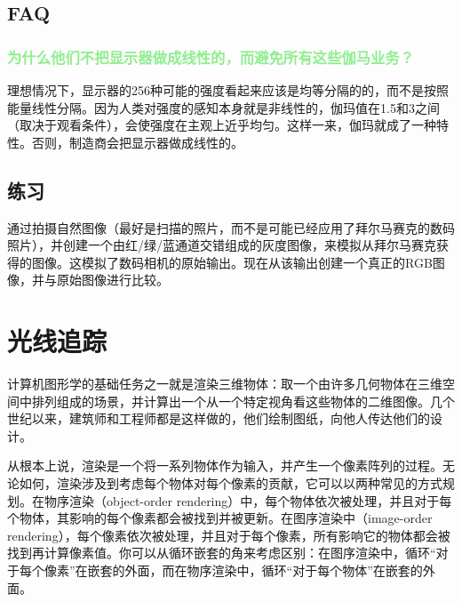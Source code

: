 \documentclass[lang=cn,12pt,marginpar=margintrue]{elegantbook}
\begin{document}
\section{FAQ}

\subsection{\textcolor{lightgreen}{为什么他们不把显示器做成线性的，而避免所有这些伽马业务？}}

理想情况下，显示器的256种可能的强度看起来应该是均等分隔的的，而不是按照能量线性分隔。因为人类对强度的感知本身就是非线性的，伽玛值在1.5和3之间（取决于观看条件），会使强度在主观上近乎均匀。这样一来，伽玛就成了一种特性。否则，制造商会把显示器做成线性的。

\section{练习}

通过拍摄自然图像（最好是扫描的照片，而不是可能已经应用了拜尔马赛克的数码照片），并创建一个由红/绿/蓝通道交错组成的灰度图像，来模拟从拜尔马赛克获得的图像。这模拟了数码相机的原始输出。现在从该输出创建一个真正的RGB图像，并与原始图像进行比较。

\chapter{光线追踪}

计算机图形学的基础任务之一就是渲染三维物体：取一个由许多几何物体在三维空间中排列组成的场景，并计算出一个从一个特定视角看这些物体的二维图像。几个世纪以来，建筑师和工程师都是这样做的，他们绘制图纸，向他人传达他们的设计。

从根本上说，渲染是一个将一系列物体作为输入，并产生一个像素阵列的过程。无论如何，渲染涉及到考虑每个物体对每个像素的贡献，它可以以两种常见的方式规划。在物序渲染（object-order rendering）中，每个物体依次被处理，并且对于每个物体，其影响的每个像素都会被找到并被更新。在图序渲染中（image-order rendering），每个像素依次被处理，并且对于每个像素，所有影响它的物体都会被找到再计算像素值。你可以从循环嵌套的角来考虑区别：在图序渲染中，循环“对于每个像素”在嵌套的外面，而在物序渲染中，循环“对于每个物体”在嵌套的外面。

\end{document}
